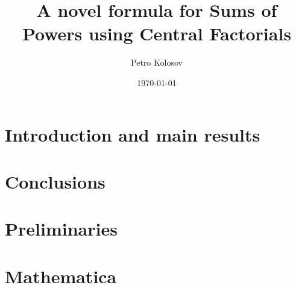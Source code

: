 \documentclass[12pt,letterpaper,oneside,reqno]{amsart}
\title[A novel formula for Sums of Powers using Central Factorials]
{A novel formula for Sums of Powers using Central Factorials}
\author[Petro Kolosov]{Petro Kolosov}
\date{\today}
\let\svthefootnote\thefootnote
\newcommand\freefootnote[1]{%
  \let\thefootnote\relax%
  \footnotetext{#1}%
  \let\thefootnote\svthefootnote%
}
\begin{document}
%   





\section{Introduction and main results}



\section*{Conclusions}


\section{Preliminaries}



% 

% 
% 

\clearpage

\section{Mathematica}



% 
\end{document}
